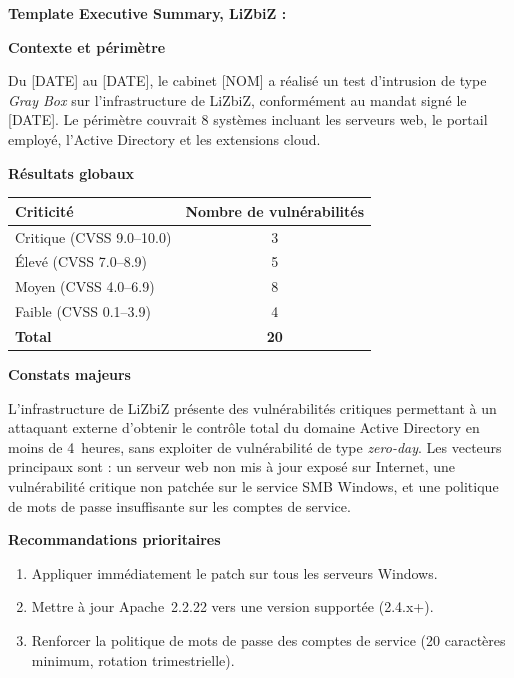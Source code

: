\begin{boxlizbiz}
\textbf{Template Executive Summary, LiZbiZ :}

\medskip
\textbf{Contexte et périmètre}

Du [DATE] au [DATE], le cabinet [NOM] a réalisé un test d'intrusion
de type \textit{Gray Box} sur l'infrastructure de LiZbiZ, conformément
au mandat signé le [DATE]. Le périmètre couvrait 8 systèmes incluant les
serveurs web, le portail employé, l'Active Directory et les extensions
cloud.

\medskip
\textbf{Résultats globaux}

\begin{center}
\begin{tabular}{lc}
\toprule
\textbf{Criticité} & \textbf{Nombre de vulnérabilités} \\
\midrule
Critique (CVSS 9.0--10.0) & 3 \\
Élevé (CVSS 7.0--8.9)     & 5 \\
Moyen (CVSS 4.0--6.9)     & 8 \\
Faible (CVSS 0.1--3.9)    & 4 \\
\midrule
\textbf{Total}             & \textbf{20} \\
\bottomrule
\end{tabular}
\end{center}

\medskip
\textbf{Constats majeurs}

L'infrastructure de LiZbiZ présente des vulnérabilités critiques permettant
à un attaquant externe d'obtenir le contrôle total du domaine Active Directory
en moins de 4~heures, sans exploiter de vulnérabilité de type \textit{zero-day}.
Les vecteurs principaux sont : un serveur web non mis à jour exposé sur Internet,
une vulnérabilité critique non patchée sur le service SMB Windows, et une
politique de mots de passe insuffisante sur les comptes de service.

\medskip
\textbf{Recommandations prioritaires}
\begin{enumerate}
    \item Appliquer immédiatement le patch  sur tous les
          serveurs Windows.
    \item Mettre à jour Apache~2.2.22 vers une version supportée (2.4.x+).
    \item Renforcer la politique de mots de passe des comptes de service
          (20 caractères minimum, rotation trimestrielle).
\end{enumerate}
\end{boxlizbiz}

